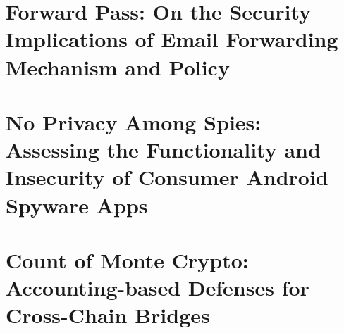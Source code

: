 \documentclass[12pt]{ucsddissertation}
\begin{document}
\tableofcontents
\listoffigures
\listoftables







\mainmatter





\chapter{Forward Pass: On the Security Implications of Email Forwarding Mechanism and Policy}
\label{chap:eurosp23}









\chapter{No Privacy Among Spies: Assessing the Functionality and Insecurity of Consumer Android Spyware Apps}
\label{chap:pets23}









\chapter{Count of Monte Crypto: Accounting-based Defenses for Cross-Chain Bridges}
\label{chap:bridge}


















\appendix



\backmatter
\end{document}
